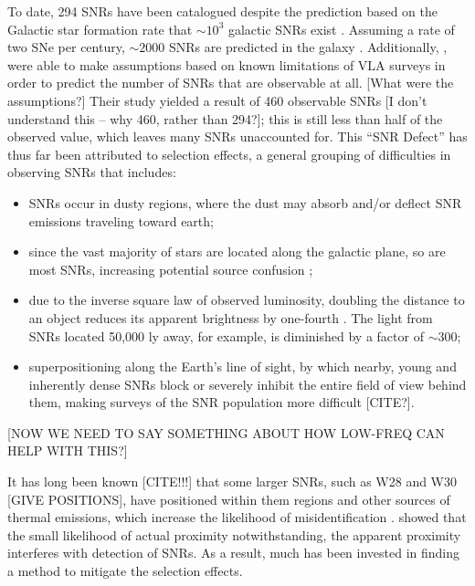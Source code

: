 \documentclass[preprint2,epsf,epsfig,graphics]{emulateapj}
\begin{document}
To date, 294 SNRs have been catalogued \citep{DAGreen.14} despite the prediction based on the Galactic star formation rate that $\sim10^3$ galactic SNRs exist \citep{Li.91}.  
Assuming a rate of two SNe per century, $\sim2000$ SNRs are predicted in the galaxy \citep{Pavlovic.13}.  
Additionally, \cite{Brogan.06}, were able to make assumptions based on known limitations of VLA surveys in order to predict the number of SNRs that are observable at all. {\color{red}[What were the assumptions?]}
Their study yielded a result of 460 observable SNRs {\color{red}[I don't understand this -- why 460, rather than 294?]}; this is still less than half of the observed value, which leaves many SNRs unaccounted for. 
This “SNR Defect” has thus far been attributed to selection effects, a general grouping of difficulties in observing SNRs that includes: 
\begin{itemize}
\item[(i)] SNRs occur in dusty regions, where the dust may absorb and/or deflect SNR emissions traveling toward earth;
\item[(ii)] since the vast majority of stars are located along the galactic plane, so are most SNRs, increasing potential source confusion \citep[e.g.][]{Gao_v.11,Gao_vi.11};
\item[(iii)] due to the inverse square law of observed luminosity, doubling the distance to an object reduces its apparent brightness by one-fourth  \citep{Green.91}. The light from SNRs located 50,000 ly away, for example, is diminished by a factor of $\sim$300;
\item[(iv)] superpositioning along the Earth’s line of sight, by which nearby, young  and inherently dense SNRs block or severely inhibit the entire field of view behind them, making surveys of the SNR population more difficult {\color{red}[CITE?]}. 
\end{itemize}
{\color{red}[NOW WE NEED TO SAY SOMETHING ABOUT HOW LOW-FREQ CAN HELP WITH THIS?]}

It has long been known {\color{red}[CITE!!!]} that some larger SNRs, such as W28 and W30 {\color{red}[GIVE POSITIONS]}, have positioned within them  regions and other sources of thermal emissions, which increase the likelihood of misidentification \citep{Andrews.85}.  \cite{Brogan.06} showed that the small likelihood of actual proximity notwithstanding, the apparent proximity interferes with detection of SNRs.  As a result, much has been invested in finding a method to mitigate the selection effects. 
\end{document}
